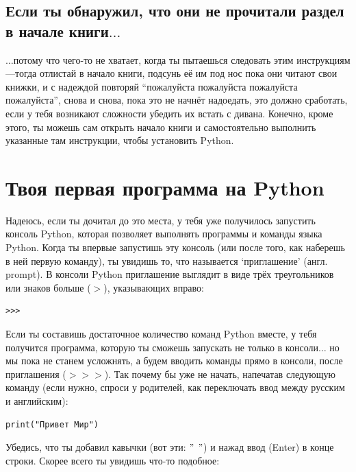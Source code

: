 \subsection*{\color{BrickRed}Если ты обнаружил, что они не прочитали раздел в начале книги$\ldots$}

$\ldots$потому что чего-то не хватает, когда ты пытаешься следовать этим инструкциям---тогда отлистай в начало книги, подсунь её им под нос пока они читают свои книжки, и с надеждой повторяй ``пожалуйста пожалуйста пожалуйста пожалуйста'', снова и снова, пока это не начнёт надоедать, это должно сработать, если у тебя возникают сложности убедить их встать с дивана.  Конечно, кроме этого, ты можешь сам открыть начало книги и самостоятельно выполнить указанные там инструкции, чтобы установить Python.

\section{Твоя первая программа на Python}

Надеюсь, если ты дочитал до это места, у тебя уже получилось запустить консоль Python, которая позволяет выполнять программы и команды языка Python. Когда ты впервые запустишь эту консоль (или после того, как наберешь в ней первую команду), ты увидишь то, что называется `приглашение' (англ. prompt).  В консоли Python  приглашение выглядит в виде трёх треугольников или знаков больше ($>$), указывающих вправо:

\begin{listing}
\begin{verbatim}
>>>
\end{verbatim}
\end{listing}
Если ты составишь достаточное количество команд Python вместе, у тебя получится программа, которую ты сможешь запускать не только в консоли$\ldots$ но мы пока не станем усложнять, а будем вводить команды прямо в консоли, после приглашения ($>>>$). Так почему бы уже не начать, напечатав следующую команду (если нужно, спроси у родителей, как переключать ввод между русским и английским):

\begin{listing}
\begin{verbatim}
print("Привет Мир")
\end{verbatim}
\end{listing}

Убедись, что ты добавил кавычки (вот эти: $"$ $"$) и нажад ввод (Enter) в конце строки. Скорее всего ты увидишь что-то подобное:


